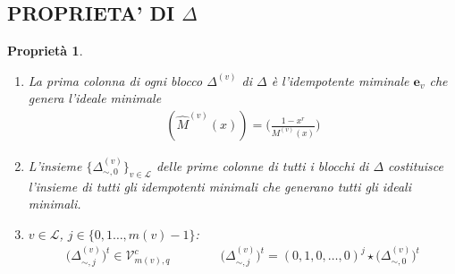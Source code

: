 \documentclass[mathserif]{beamer}
\def\quotient#1#2{%
   \raise1ex\hbox{$#1$}\Big/\lower1ex\hbox{$#2$}%
}
\newtheorem{prop}{Proprietà}
\begin{document}


\subsection{PROPRIETA' DI $\Delta$}
\begin{frame}
    \begin{prop}
    \begin{enumerate}
      \item  La prima colonna di ogni blocco $\Delta^{(v)}$ di $\Delta$ è l'idempotente miminale $\mathbf{e}_{v}$ che genera l'ideale minimale 
      \begin{align*}
	  (\hat{M}^{(v)}(x)) = \Big(\frac{1-x^r}{M^{(v)}(x)} \Big)
      \end{align*}
      \item L'insieme $\lbrace \Delta_{\sim, 0}^{(v)} \rbrace_{v\in \mathscr{L}}$ delle prime colonne di tutti i blocchi di $\Delta$ costituisce l'insieme di tutti gli idempotenti minimali che generano tutti gli ideali minimali.
      \item  $v \in \mathscr{L}$, $j \in \lbrace 0, 1 \dots , m(v)-1 \rbrace$:
      \begin{align*}
      \big( \Delta_{\sim, j}^{(v)} \big)^{t} \in \mathcal{V}_{m(v), q}^{c} 
      \qquad \qquad 
      \big( \Delta_{\sim, j}^{(v)} \big)^{t}  =  (0,1,0,\dots,0)^{j} \star \big( \Delta_{\sim, 0}^{(v)} \big)^{t}  
      \end{align*}
    \end{enumerate}  
    \end{prop}
\end{frame}
\end{document}
